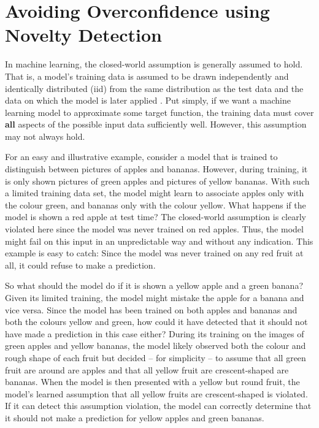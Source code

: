 \section{Avoiding Overconfidence using Novelty Detection} \label{txt:novelty-detection}

In machine learning, the closed-world assumption is generally assumed to hold. That is, a model's training data is assumed to be drawn independently and identically distributed (iid) from the same distribution as the test data and the data on which the model is later applied \cite{ood-boundary-2021}. Put simply, if we want a machine learning model to approximate some target function, the training data must cover \textbf{all} aspects of the possible input data sufficiently well. However, this assumption may not always hold.

\newpar For an easy and illustrative example, consider a model that is trained to distinguish between pictures of apples and bananas. However, during training, it is only shown pictures of green apples and pictures of yellow bananas. With such a limited training data set, the model might learn to associate apples only with the colour green, and bananas only with the colour yellow. What happens if the model is shown a red apple at test time? The closed-world assumption is clearly violated here since the model was never trained on red apples. Thus, the model might fail on this input in an unpredictable way and without any indication. This example is easy to catch: Since the model was never trained on any red fruit at all, it could refuse to make a prediction.

So what should the model do if it is shown a yellow apple and a green banana? Given its limited training, the model might mistake the apple for a banana and vice versa. Since the model has been trained on both apples and bananas and both the colours yellow and green, how could it have detected that it should not have made a prediction in this case either? During its training on the images of green apples and yellow bananas, the model likely observed both the colour and rough shape of each fruit but decided -- for simplicity -- to assume that all green fruit are around are apples and that all yellow fruit are crescent-shaped are bananas. When the model is then presented with a yellow but round fruit, the model's learned assumption that all yellow fruits are crescent-shaped is violated. If it can detect this assumption violation, the model can correctly determine that it should not make a prediction for yellow apples and green bananas.

